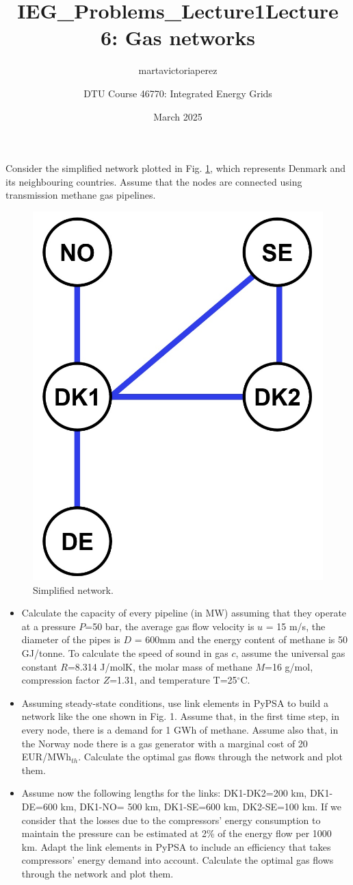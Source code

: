 \documentclass[10pt]{article}
\title{IEG_Problems_Lecture1}
\author{martavictoriaperez }
\date{March 2025}
\newenvironment{problem}[2][Problem]{\begin{trivlist}
\item[\hskip \labelsep {\bfseries #1}\hskip \labelsep {\bfseries #2.}]}{\end{trivlist}}
\begin{document}
 
\title{\textbf{Lecture 6: Gas networks}}
\author{
DTU Course 46770: Integrated Energy Grids }
\maketitle

\begin{problem}{6.1}

Consider the simplified network plotted in Fig. \ref{fig_network}, which represents Denmark and its neighbouring countries. Assume that the nodes are connected using transmission methane gas pipelines.

\begin{figure}
    \centering
    \includegraphics[width=0.2\linewidth]{figures/nodes.jpg}
    \caption{Simplified network.}
    \label{fig_network}
\end{figure}
\begin{itemize}

\item[a)] Calculate the capacity of every pipeline (in MW) assuming that they operate at a pressure $P$=50 bar, the average gas flow velocity is $u$ = 15 m/s, the diameter of the pipes is $D$ = 600mm and the energy content of methane is 50 GJ/tonne. To calculate the speed of sound in gas $c$, assume the universal gas constant $R$=8.314 J/molK, the molar mass of methane $M$=16 g/mol, compression factor $Z$=1.31, and temperature T=25$^{\circ}$C.

\item[b)] Assuming steady-state conditions, use link elements in PyPSA to build a network like the one shown in Fig. 1.  Assume that, in the first time step,  in every node, there is a demand for 1 GWh of methane.  Assume also that, in the Norway node there is a gas generator with a marginal cost of 20 EUR/MWh$_{th}$. Calculate the optimal gas flows through the network and plot them.

\item[c)] Assume now the following lengths for the links: DK1-DK2=200 km, DK1-DE=600 km, DK1-NO= 500 km, DK1-SE=600 km, DK2-SE=100 km. If we consider that the losses due to the compressors' energy consumption to maintain the pressure can be estimated at 2\% of the energy flow per 1000 km. Adapt the link elements in PyPSA to include an efficiency that takes compressors' energy demand into account. Calculate the optimal gas flows through the network and plot them.


\end{itemize}
\end{problem}
\end{document}
